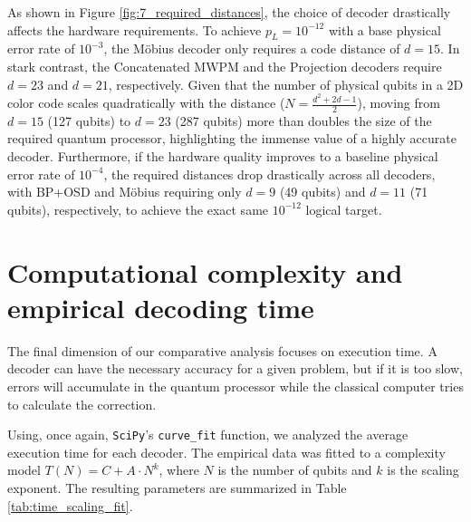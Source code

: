  As shown in Figure \ref{fig:7_required_distances}, the choice of decoder drastically affects the hardware requirements. To achieve $p_L=10^{-12}$ with a base physical error rate of $10^{-3}$, the Möbius decoder only requires a code distance of $d=15$. In stark contrast, the Concatenated MWPM and the Projection decoders require $d=23$ and $d=21$, respectively. Given that the number of physical qubits in a 2D color code scales quadratically with the distance ($N = \frac{d^2 + 2d - 1}{2}$), moving from $d=15$ (127 qubits) to $d=23$ (287 qubits) more than doubles the size of the required quantum processor, highlighting the immense value of a highly accurate decoder. Furthermore, if the hardware quality improves to a baseline physical error rate of $10^{-4}$, the required distances drop drastically across all decoders, with BP+OSD and Möbius requiring only $d=9$ (49 qubits) and $d=11$ (71 qubits), respectively, to achieve the exact same $10^{-12}$ logical target.

\section{Computational complexity and empirical decoding time}

The final dimension of our comparative analysis focuses on execution time. A decoder can have the necessary accuracy for a given problem, but if it is too slow, errors will accumulate in the quantum processor while the classical computer tries to calculate the correction.

 Using, once again, \texttt{SciPy}'s \texttt{curve\_fit} function, we analyzed the average execution time for each decoder. The empirical data was fitted to a complexity model $T(N) = C + A \cdot N^k$, where $N$ is the number of qubits and $k$ is the scaling exponent. The resulting parameters are summarized in Table \ref{tab:time_scaling_fit}.



